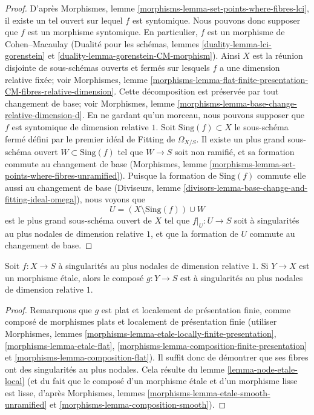 \begin{proof}
D'après Morphismes, lemme \ref{morphisms-lemma-set-points-where-fibres-lci}, il existe un tel ouvert sur lequel $f$ est syntomique. Nous pouvons donc supposer que $f$ est un morphisme syntomique. En particulier, $f$ est un morphisme de Cohen--Macaulay (Dualité pour les schémas, lemmes \ref{duality-lemma-lci-gorenstein} et \ref{duality-lemma-gorenstein-CM-morphism}). Ainsi $X$ est la réunion disjointe de sous-schémas ouverts et fermés sur lesquels $f$ a une dimension relative fixée; voir Morphismes, lemme \ref{morphisms-lemma-flat-finite-presentation-CM-fibres-relative-dimension}. Cette décomposition est préservée par tout changement de base; voir Morphismes, lemme \ref{morphisms-lemma-base-change-relative-dimension-d}. En ne gardant qu'un morceau, nous pouvons supposer que $f$ est syntomique de dimension relative $1$. Soit $\text{Sing}(f) \subset X$ le sous-schéma fermé défini par le premier idéal de Fitting de $\Omega_{X/S}$. Il existe un plus grand sous-schéma ouvert $W \subset \text{Sing}(f)$ tel que $W \to S$ soit non ramifié, et sa formation commute au changement de base (Morphismes, lemme \ref{morphisms-lemma-set-points-where-fibres-unramified}). Puisque la formation de $\text{Sing}(f)$ commute elle aussi au changement de base (Diviseurs, lemme \ref{divisors-lemma-base-change-and-fitting-ideal-omega}), nous voyons que $$
U = (X \setminus \text{Sing}(f)) \cup W
$$ est le plus grand sous-schéma ouvert de $X$ tel que $f|_U : U \to S$ soit à singularités au plus nodales de dimension relative $1$, et que la formation de $U$ commute au changement de base.
\end{proof}

\begin{lemma}
\label{lemma-nodal-family-precompose-etale}
Soit $f : X \to S$ à singularités au plus nodales de dimension relative $1$. Si $Y \to X$ est un morphisme étale, alors le composé $g : Y \to S$ est à singularités au plus nodales de dimension relative $1$.
\end{lemma}

\begin{proof}
Remarquons que $g$ est plat et localement de présentation finie, comme composé de morphismes plats et localement de présentation finie (utiliser Morphismes, lemmes \ref{morphisms-lemma-etale-locally-finite-presentation}, \ref{morphisms-lemma-etale-flat}, \ref{morphisms-lemma-composition-finite-presentation} et \ref{morphisms-lemma-composition-flat}). Il suffit donc de démontrer que ses fibres ont des singularités au plus nodales. Cela résulte du lemme \ref{lemma-node-etale-local} (et du fait que le composé d'un morphisme étale et d'un morphisme lisse est lisse, d'après Morphismes, lemmes \ref{morphisms-lemma-etale-smooth-unramified} et \ref{morphisms-lemma-composition-smooth}).
\end{proof}

